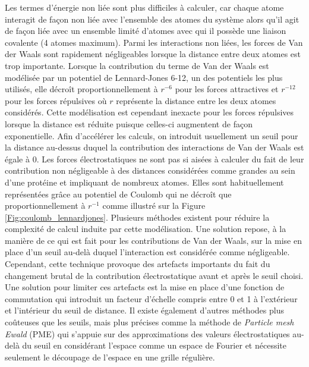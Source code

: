 Les termes d'énergie non liée sont plus difficiles à calculer, car chaque atome interagit de façon non liée avec l'ensemble des atomes du système alors qu'il agit de façon liée avec un ensemble limité d'atomes avec qui il possède une liaison covalente (4 atomes maximum). 
Parmi les interactions non liées, les forces de Van der Waals sont rapidement négligeables lorsque la distance entre deux atomes est trop importante. Lorsque la contribution du terme de Van der Waals est modélisée par un potentiel de Lennard-Jones 6-12, un des potentiels les plus utilisés, elle décroît proportionnellement à $r^{-6}$ pour les forces attractives et $r^{-12}$ pour les forces répulsives où $r$ représente la distance entre les deux atomes considérés. Cette modélisation est cependant inexacte pour les forces répulsives lorsque la distance est réduite puisque celles-ci augmentent de façon exponentielle. Afin d'accélérer les calculs, on introduit usuellement un seuil pour la distance au-dessus duquel la contribution des interactions de Van der Waals est égale à 0.
Les forces électrostatiques ne sont pas si aisées à calculer du fait de leur contribution non négligeable à des distances considérées comme grandes au sein d'une protéine et impliquant de nombreux atomes. Elles sont habituellement représentées grâce au potentiel de Coulomb qui ne décroît que proportionnellement à $r^{-1}$ comme illustré sur la Figure \ref{Fig:coulomb_lennardjones}. Plusieurs méthodes existent pour réduire la complexité de calcul induite par cette modélisation. Une solution repose, à la manière de ce qui est fait pour les contributions de Van der Waals, sur la mise en place d'un seuil au-delà duquel l'interaction est considérée comme négligeable. Cependant, cette technique provoque des artefacts importants du fait du changement brutal de la contribution électrostatique avant et après le seuil choisi. Une solution pour limiter ces artefacts est la mise en place d'une fonction de commutation qui introduit un facteur d'échelle compris entre 0 et 1 à l'extérieur et l'intérieur du seuil de distance. Il existe également d'autres méthodes plus coûteuses que les seuils, mais plus précises comme la méthode de \textit{Particle mesh Ewald} (PME) qui s'appuie sur des approximations des valeurs électrostatiques au-delà du seuil en considérant l'espace comme un espace de Fourier et nécessite seulement le découpage de l'espace en une grille régulière.

